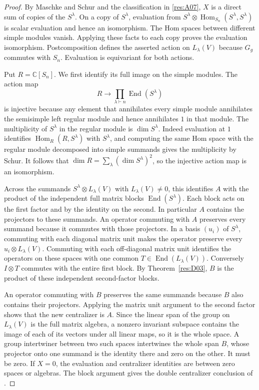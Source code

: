 \begin{proof}
By Maschke and Schur \cite[Chapter 8]{algebra-core} and the
classification in \ref{res:A07}, \(X\) is a direct sum of copies
of the \(S^\lambda\). On a copy of \(S^\lambda\), evaluation
from \(S^\lambda\otimes\operatorname{Hom}_{S_n}(S^\lambda,S^\lambda)\)
is scalar evaluation and hence an isomorphism. The Hom spaces
between different simple modules vanish. Applying these facts to
each copy proves the evaluation isomorphism. Postcomposition
defines the asserted action on \(L_\lambda(V)\) because \(G_g\)
commutes with \(S_n\). Evaluation is equivariant for both actions.

Put \(R=\mathbb C[S_n]\). We first identify its full image on
the simple modules. The action map
\[
 R\longrightarrow \prod_{\lambda\vdash n}\operatorname{End}(S^\lambda)
\]
is injective because any element that annihilates every simple
module annihilates the semisimple left regular module and hence
annihilates \(1\) in that module. The multiplicity of \(S^\lambda\)
in the regular module is \(\dim S^\lambda\). Indeed evaluation
at \(1\) identifies \(\operatorname{Hom}_R(R,S^\lambda)\) with
\(S^\lambda\), and computing the same Hom space with the
regular module decomposed into simple summands gives the
multiplicity by Schur. It follows that
\(\dim R=\sum_{\lambda}(\dim S^\lambda)^2\), so the injective
action map is an isomorphism.

Across the summands \(S^\lambda\otimes L_\lambda(V)\) with
\(L_\lambda(V)\ne0\), this identifies \(A\) with the product of the
independent full matrix blocks \(\operatorname{End}(S^\lambda)\).
Each block acts on the first factor and by the identity on the
second. In particular \(A\) contains the projectors to these
summands. An operator commuting with \(A\) preserves every
summand because it commutes with those projectors. In a basis
\((u_i)\) of \(S^\lambda\), commuting with each diagonal matrix
unit makes the operator preserve every \(u_i\otimes L_\lambda(V)\).
Commuting with each off-diagonal matrix unit identifies the
operators on these spaces with one common
\(T\in\operatorname{End}(L_\lambda(V))\). Conversely
\(I\otimes T\) commutes with the entire first block. By
Theorem~\ref{res:D03}, \(B\) is the product of these independent
second-factor blocks.

An operator commuting with \(B\) preserves the same summands
because \(B\) also contains their projectors. Applying the matrix
unit argument to the second factor shows that the new centralizer
is \(A\). Since the linear span of the group on \(L_\lambda(V)\)
is the full matrix algebra, a nonzero invariant subspace contains
the image of each of its vectors under all linear maps, so it is the
whole space. A group intertwiner between two such spaces intertwines
the whole span \(B\), whose projector onto one summand is the
identity there and zero on the other. It must be zero.
If \(X=0\), the evaluation and centralizer identities are between
zero spaces or algebras. The block argument gives the
double centralizer conclusion of
\cite[Theorems 4.54 and 4.57 and Corollary 4.59]{etingof}.
\end{proof}

